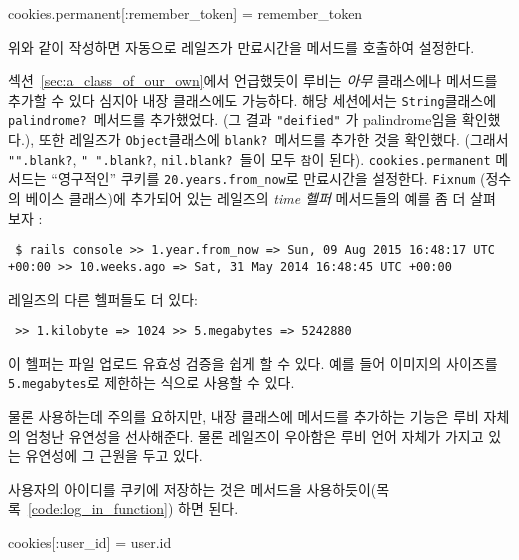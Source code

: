 {{%
\begin{code} cookies.permanent[:remember_token] = remember_token \end{code} 

\noindent 위와 같이 작성하면 자동으로 레일즈가 만료시간을  메서드를 호출하여 설정한다. 

\begin{aside} \label{aside:time_helpers}  

섹션~\ref{sec:a_class_of_our_own}에서 언급했듯이 루비는 \emph{아무} 클래스에나 메서드를 추가할 수 있다 심지아 내장 클래스에도 가능하다. 해당 세션에서는 \texttt{String}클래스에 \texttt{palindrome?}\  메서드를 추가했었다. (그 결과 \texttt{"deified"} 가 palindrome임을 확인했다.), 또한 레일즈가 \texttt{Object}클래스에 \texttt{blank?}\  메서드를 추가한 것을 확인했다. (그래서 \texttt{"".blank?}, \texttt{"~".blank?}, \texttt{nil.blank?}\ 들이 모두 \texttt{참}이 된다). \texttt{cookies.permanent} 메서드는 ``영구적인'' 쿠키를 \texttt{20.years.from\_now}로 만료시간을 설정한다. \texttt{Fixnum} (정수의 베이스 클래스)에 추가되어 있는 레일즈의 \emph{time 헬퍼} 메서드들의 예를 좀 더 살펴 보자 : 

\begin{verbatim} $ rails console >> 1.year.from_now => Sun, 09 Aug 2015 16:48:17 UTC +00:00 >> 10.weeks.ago => Sat, 31 May 2014 16:48:45 UTC +00:00 \end{verbatim} 

\noindent 레일즈의 다른 헬퍼들도 더 있다: 

\begin{verbatim} >> 1.kilobyte => 1024 >> 5.megabytes => 5242880 \end{verbatim} 

\noindent 이 헬퍼는 파일 업로드 유효성 검증을 쉽게 할 수 있다. 예를 들어 이미지의 사이즈를 \texttt{5.megabytes}로 제한하는 식으로 사용할 수 있다. 

물론 사용하는데 주의를 요하지만, 내장 클래스에 메서드를 추가하는 기능은 루비 자체의 엄청난 유연성을 선사해준다. 물론 레일즈이 우아함은 루비 언어 자체가 가지고 있는 유연성에 그 근원을 두고 있다. 

\end{aside} 

사용자의 아이디를 쿠키에 저장하는 것은  메서드을 사용하듯이(목록~\ref{code:log_in_function}) 하면 된다. 

\begin{code} cookies[:user_id] = user.id \end{code} 

}}
